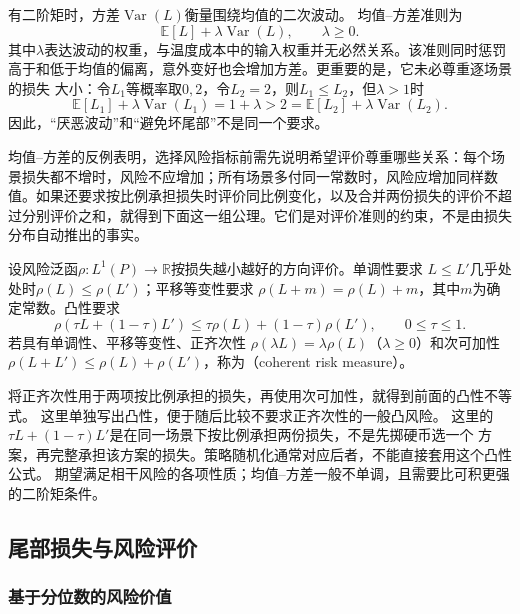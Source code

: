 有二阶矩时，方差$\operatorname{Var}(L)$衡量围绕均值的二次波动。
均值--方差准则为
\[
  \mathbb E[L]+\lambda\operatorname{Var}(L),\qquad \lambda\geq0.
\]
其中$\lambda$表达波动的权重，与温度成本中的输入权重并无必然关系。该准则同时惩罚
高于和低于均值的偏离，意外变好也会增加方差。更重要的是，它未必尊重逐场景的损失
大小：令$L_1$等概率取$0,2$，令$L_2=2$，则$L_1\leq L_2$，但$\lambda>1$时
\[
  \mathbb E[L_1]+\lambda\operatorname{Var}(L_1)=1+\lambda>2
  =\mathbb E[L_2]+\lambda\operatorname{Var}(L_2).
\]
因此，“厌恶波动”和“避免坏尾部”不是同一个要求。

均值--方差的反例表明，选择风险指标前需先说明希望评价尊重哪些关系：每个场景损失都不增时，风险不应增加；所有场景多付同一常数时，风险应增加同样数值。如果还要求按比例承担损失时评价同比例变化，以及合并两份损失的评价不超过分别评价之和，就得到下面这一组公理。它们是对评价准则的约束，不是由损失分布自动推出的事实。
\begin{definition}[相干风险]
\label{def:decision-coherent-risk}
设风险泛函$\rho:L^1(P)\to\mathbb R$按损失越小越好的方向评价。单调性要求
$L\leq L'$几乎处处时$\rho(L)\leq\rho(L')$；平移等变性要求
$\rho(L+m)=\rho(L)+m$，其中$m$为确定常数。凸性要求
\[
  \rho(\tau L+(1-\tau)L')
  \leq\tau\rho(L)+(1-\tau)\rho(L'),\qquad 0\leq\tau\leq1.
\]
若具有单调性、平移等变性、正齐次性
$\rho(\lambda L)=\lambda\rho(L)$（$\lambda\geq0$）和次可加性
$\rho(L+L')\leq\rho(L)+\rho(L')$，称为（coherent risk measure）。
\end{definition}

将正齐次性用于两项按比例承担的损失，再使用次可加性，就得到前面的凸性不等式。
这里单独写出凸性，便于随后比较不要求正齐次性的一般凸风险。
这里的$\tau L+(1-\tau)L'$是在同一场景下按比例承担两份损失，不是先掷硬币选一个
方案，再完整承担该方案的损失。策略随机化通常对应后者，不能直接套用这个凸性公式。
期望满足相干风险的各项性质；均值--方差一般不单调，且需要比可积更强的二阶矩条件。

\subsection{尾部损失与风险评价}

\subsubsection{基于分位数的风险价值}

